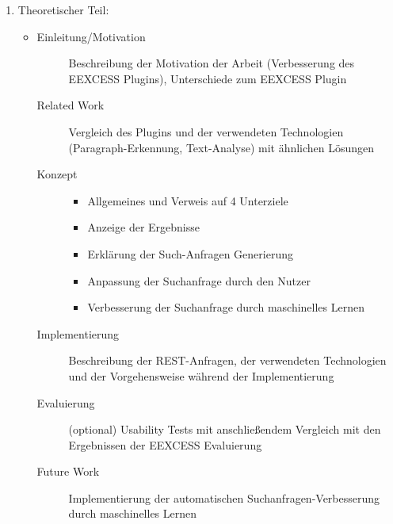 \documentclass{llncs}
\begin{document}
\begin{enumerate}[label=\Roman*)]
\item Theoretischer Teil:
\begin{itemize}
\item[]
\begin{description}
\item [Einleitung/Motivation] Beschreibung der Motivation der Arbeit (Verbesserung des EEXCESS Plugins), Unterschiede zum EEXCESS Plugin
\item [Related Work] Vergleich des Plugins und der verwendeten Technologien (Paragraph-Erkennung, Text-Analyse) mit ähnlichen Lösungen
\item [Konzept]                                                                                           
	\begin{itemize}
		\item Allgemeines und Verweis auf 4 Unterziele
		\item Anzeige der Ergebnisse
		\item Erklärung der Such-Anfragen Generierung
		\item Anpassung der Suchanfrage durch den Nutzer
		\item Verbesserung der Suchanfrage durch maschinelles Lernen
	\end{itemize}
\item [Implementierung] Beschreibung der REST-Anfragen, der verwendeten Technologien und der Vorgehensweise während der Implementierung
\item [Evaluierung] (optional) Usability Tests mit anschließendem Vergleich mit den Ergebnissen der EEXCESS Evaluierung
\item [Future Work] Implementierung der automatischen Suchanfragen-Verbesserung durch maschinelles Lernen
\end{description}
\end{itemize}
\end{enumerate}
\end{document}
